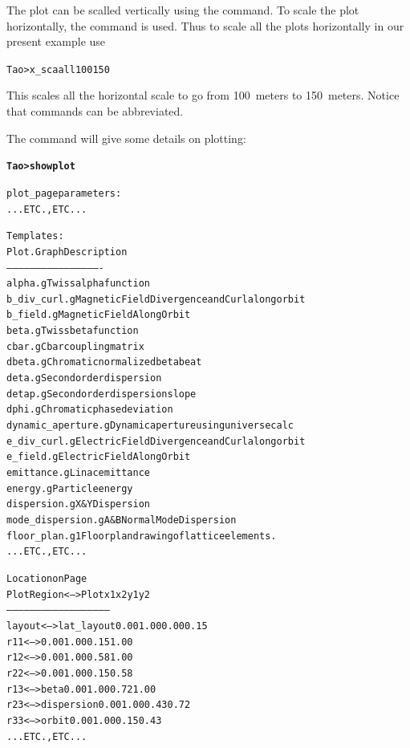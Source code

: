 \documentclass{hitec}
\begin{document}
The plot can be scalled vertically using the  command. To scale the plot horizontally, 
the command  is used. Thus to scale all the plots horizontally in our present example use
\begin{alltt}
  Tao> x_sca all 100 150
\end{alltt}
This scales all the horizontal scale to go from 100~meters to 150~meters.  Notice that
commands can be abbreviated.

The  command will give some details on plotting:
\begin{alltt}
  {\normalfont\textbf{Tao> show plot}}

    plot_page parameters:
    ... ETC., ETC ...

  Templates:
     Plot                  .Graph   Description
     --------------------  -------- -------------------
     alpha                 .g       Twiss alpha function
     b_div_curl            .g       Magnetic Field Divergence and Curl along orbit
     b_field               .g       Magnetic Field Along Orbit
     beta                  .g       Twiss beta function
     cbar                  .g       Cbar coupling matrix
     dbeta                 .g       Chromatic normalized beta beat
     deta                  .g       Second order dispersion
     detap                 .g       Second order dispersion slope
     dphi                  .g       Chromatic phase deviation
     dynamic_aperture      .g       Dynamic aperture using universe calc
     e_div_curl            .g       Electric Field Divergence and Curl along orbit
     e_field               .g       Electric Field Along Orbit
     emittance             .g       Linac emittance
     energy                .g       Particle energy
     dispersion            .g       X & Y Dispersion
     mode_dispersion       .g       A & B Normal Mode Dispersion
     floor_plan            .g1      Floor plan drawing of lattice elements.
    ... ETC., ETC ...

                                                 Location on Page
  Plot Region         <-->  Plot                 x1    x2    y1    y2
  -----------               -----------------------------------------
  layout              <-->  lat_layout          0.00  1.00  0.00  0.15
  r11                 <-->                      0.00  1.00  0.15  1.00
  r12                 <-->                      0.00  1.00  0.58  1.00
  r22                 <-->                      0.00  1.00  0.15  0.58
  r13                 <-->  beta                0.00  1.00  0.72  1.00
  r23                 <-->  dispersion          0.00  1.00  0.43  0.72
  r33                 <-->  orbit               0.00  1.00  0.15  0.43
    ... ETC., ETC ...
\end{alltt}
\end{document}
